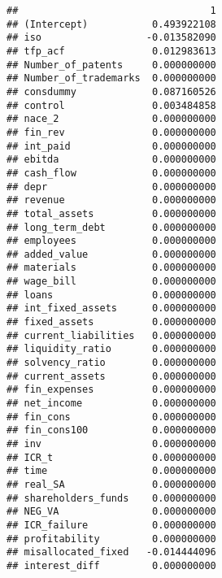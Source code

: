 \documentclass[]{article}
\newenvironment{Shaded}{\begin{snugshade}}{\end{snugshade}}
\newcommand{\DataTypeTok}[1]{\textcolor[rgb]{0.13,0.29,0.53}{#1}}
\newcommand{\DecValTok}[1]{\textcolor[rgb]{0.00,0.00,0.81}{#1}}
\newcommand{\FloatTok}[1]{\textcolor[rgb]{0.00,0.00,0.81}{#1}}
\newcommand{\KeywordTok}[1]{\textcolor[rgb]{0.13,0.29,0.53}{\textbf{#1}}}
\newcommand{\NormalTok}[1]{#1}
\newcommand{\OperatorTok}[1]{\textcolor[rgb]{0.81,0.36,0.00}{\textbf{#1}}}
\newcommand{\StringTok}[1]{\textcolor[rgb]{0.31,0.60,0.02}{#1}}
\begin{document}
\begin{Shaded}
\end{Shaded}

\begin{verbatim}
##                                 1
## (Intercept)           0.493922108
## iso                  -0.013582090
## tfp_acf               0.012983613
## Number_of_patents     0.000000000
## Number_of_trademarks  0.000000000
## consdummy             0.087160526
## control               0.003484858
## nace_2                0.000000000
## fin_rev               0.000000000
## int_paid              0.000000000
## ebitda                0.000000000
## cash_flow             0.000000000
## depr                  0.000000000
## revenue               0.000000000
## total_assets          0.000000000
## long_term_debt        0.000000000
## employees             0.000000000
## added_value           0.000000000
## materials             0.000000000
## wage_bill             0.000000000
## loans                 0.000000000
## int_fixed_assets      0.000000000
## fixed_assets          0.000000000
## current_liabilities   0.000000000
## liquidity_ratio       0.000000000
## solvency_ratio        0.000000000
## current_assets        0.000000000
## fin_expenses          0.000000000
## net_income            0.000000000
## fin_cons              0.000000000
## fin_cons100           0.000000000
## inv                   0.000000000
## ICR_t                 0.000000000
## time                  0.000000000
## real_SA               0.000000000
## shareholders_funds    0.000000000
## NEG_VA                0.000000000
## ICR_failure           0.000000000
## profitability         0.000000000
## misallocated_fixed   -0.014444096
## interest_diff         0.000000000
\end{verbatim}

\begin{Shaded}
\end{Shaded}
\end{document}
